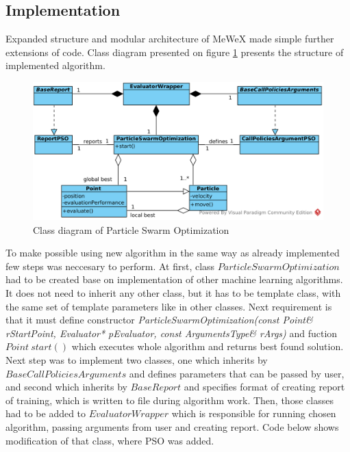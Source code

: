 \subsection{Implementation}
Expanded structure and modular architecture of MeWeX made simple further extensions of code. Class diagram presented on figure \ref{img_pso_class}
presents the structure of implemented algorithm.
\begin{figure}[ht]
\centering
    \includegraphics[scale=0.5]{img/pso_class.png}
    \caption{Class diagram of Particle Swarm Optimization}
    \label{img_pso_class}
\end{figure}


To make possible using new algorithm in the same way as already implemented few steps was neccesary to perform.
At first, class \(ParticleSwarmOptimization\) had to be created base on implementation of other machine learning algorithms. 
It does not need to inherit any other class, but it has to be template class, with the same set of template parameters like in other classes. 
Next requirement is that it must define constructor \textit{ParticleSwarmOptimization(const Point\& rStartPoint, Evaluator* pEvaluator, const ArgumentsType\& rArgs)} 
and fuction \(Point\ start()\) which executes whole algorithm and returns best found solution.
Next step was to implement two classes, one which inherits by \(BaseCallPoliciesArguments\) and defines parameters that can be passed by user, 
and second which inherits by \(BaseReport\) and specifies format of creating report of training, which is written to file during algorithm work.
Then, those classes had to be added to \(EvaluatorWrapper\) which is responsible for running chosen algorithm, 
passing arguments from user and creating report. Code below shows modification of that class, where PSO was added.

